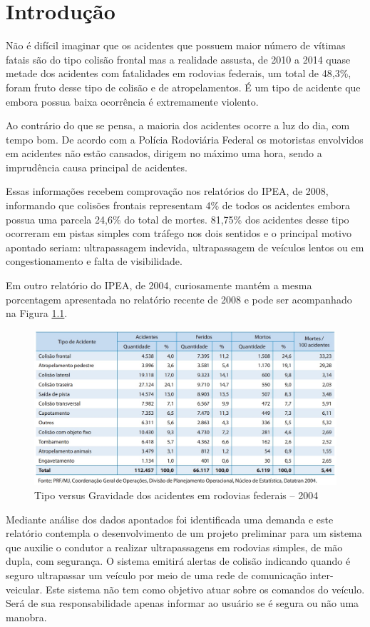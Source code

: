 \chapter[Introdução]{Introdução}

Não é difícil imaginar que os acidentes que possuem maior número de vítimas fatais são do tipo
colisão frontal mas a realidade assusta, de 2010 a 2014 quase metade dos acidentes com
fatalidades em rodovias federais, um total de 48,3\%, foram fruto desse tipo de colisão e de
atropelamentos. É um tipo de acidente que embora possua baixa ocorrência é extremamente violento. \cite{ipea}

	Ao contrário do que se pensa, a maioria dos acidentes ocorre a luz do dia, com tempo bom.
  De acordo com a Polícia Rodoviária Federal os motoristas envolvidos em acidentes não estão
  cansados, dirigem no máximo uma hora, sendo a imprudência causa
  principal de acidentes. \cite{acidentesDeTransitoNoBrasil}

	Essas informações recebem comprovação nos relatórios do IPEA, de 2008, informando que colisões
   frontais representam 4\% de todos os acidentes embora possua uma parcela 24,6\% do total de
   mortes. 81,75\% dos acidentes desse tipo ocorreram em pistas simples com tráfego nos dois
   sentidos e o principal motivo apontado seriam: ultrapassagem indevida, ultrapassagem de
   veículos lentos ou em congestionamento e falta de visibilidade. \cite{fatoresCondicionantesGravidade}

	Em outro relatório do IPEA, de 2004, curiosamente mantém a mesma porcentagem apresentada no
   relatório recente de 2008 e pode ser acompanhado na Figura \ref{fig:introducao}. \cite{custos_acidentes_transito}

   \begin{figure}[h]
     \centering
     \includegraphics[width=450px, scale=0.5]{figuras/introducao}
     \caption{Tipo versus Gravidade dos acidentes em rodovias federais – 2004}
     \label{fig:introducao}
   \end{figure}


   Mediante análise dos dados apontados foi identificada uma demanda e este relatório
   contempla o desenvolvimento de um projeto preliminar para um sistema que auxilie o
   condutor a realizar ultrapassagens em rodovias simples, de mão dupla, com segurança.
    O sistema emitirá alertas de colisão indicando quando é seguro ultrapassar um veículo
     por meio de uma rede de comunicação inter-veicular. Este sistema não tem como objetivo
      atuar sobre os comandos do veículo. Será de sua responsabilidade apenas informar
      ao usuário se é segura ou não uma manobra.
